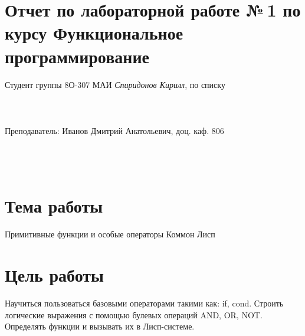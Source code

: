 \documentclass[12pt]{article}
\begin{document}
\section*{Отчет по лабораторной работе №\,1
по курсу \guillemotleft  Функциональное программирование\guillemotright}
\begin{flushright}
Студент группы 8О-307 МАИ \textit{Спиридонов Кирилл},  по списку \\
 \\
 \\
\ \\
Преподаватель: Иванов Дмитрий Анатольевич, доц. каф. 806 \\
 \\
 \\
 \\

\end{flushright}

\section{Тема работы}
{\large Примитивные функции и особые операторы Коммон Лисп \par}

\section{Цель работы}
{\large Научиться пользоваться базовыми операторами такими как: if, cond. Строить
логические выражения с помощью булевых операций AND, OR, NOT. Определять функции
и вызывать их в Лисп-системе. \par}
\end{document}
